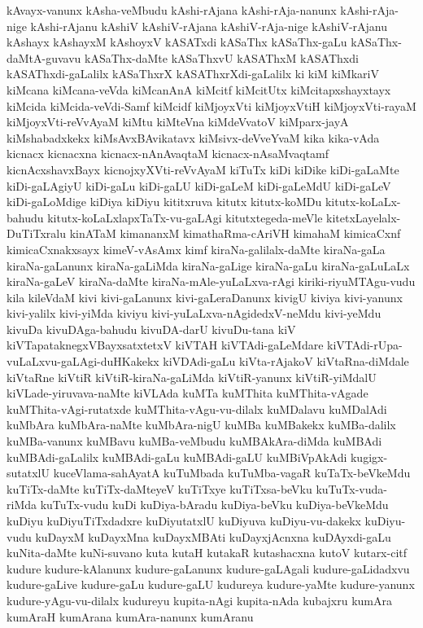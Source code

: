 {kAvayx-vanunx
kAsha-veMbudu
kAshi-rAjana
kAshi-rAja-nanunx
kAshi-rAja-nige
kAshi-rAjanu
kAshiV
kAshiV-rAjana
kAshiV-rAja-nige
kAshiV-rAjanu
kAshayx
kAshayxM
kAshoyxV
kASATxdi
kASaThx
kASaThx-gaLu
kASaThx-daMtA-guvavu
kASaThx-daMte
kASaThxvU
kASAThxM
kASAThxdi
kASAThxdi-gaLalilx
kASaThxrX
kASAThxrXdi-gaLalilx
ki
kiM
kiMkariV
kiMcana
kiMcana-veVda
kiMcanAnA
kiMcitf
kiMcitUtx
kiMcitapxshayxtayx
kiMcida
kiMcida-veVdi-Samf
kiMcidf
kiMjoyxVti
kiMjoyxVtiH
kiMjoyxVti-rayaM
kiMjoyxVti-reVvAyaM
kiMtu
kiMteVna
kiMdeVvatoV
kiMparx-jayA
kiMshabadxkekx
kiMsAvxBAvikatavx
kiMsivx-deVveYvaM
kika
kika-vAda
kicnacx
kicnacxna
kicnacx-nAnAvaqtaM
kicnacx-nAsaMvaqtamf
kicnAcxshavxBayx
kicnojxyXVti-reVvAyaM
kiTuTx
kiDi
kiDike
kiDi-gaLaMte
kiDi-gaLAgiyU
kiDi-gaLu
kiDi-gaLU
kiDi-gaLeM
kiDi-gaLeMdU
kiDi-gaLeV
kiDi-gaLoMdige
kiDiya
kiDiyu
kititxruva
kitutx
kitutx-koMDu
kitutx-koLaLx-bahudu
kitutx-koLaLxlapxTaTx-vu-gaLAgi
kitutxtegeda-meVle
kitetxLayelalx-DuTiTxralu
kinATaM
kimananxM
kimathaRma-cAriVH
kimahaM
kimicaCxnf
kimicaCxnakxsayx
kimeV-vAsAmx
kimf
kiraNa-galilalx-daMte
kiraNa-gaLa
kiraNa-gaLanunx
kiraNa-gaLiMda
kiraNa-gaLige
kiraNa-gaLu
kiraNa-gaLuLaLx
kiraNa-gaLeV
kiraNa-daMte
kiraNa-mAle-yuLaLxva-rAgi
kiriki-riyuMTAgu-vudu
kila
kileVdaM
kivi
kivi-gaLanunx
kivi-gaLeraDanunx
kivigU
kiviya
kivi-yanunx
kivi-yalilx
kivi-yiMda
kiviyu
kivi-yuLaLxva-nAgidedxV-neMdu
kivi-yeMdu
kivuDa
kivuDAga-bahudu
kivuDA-darU
kivuDu-tana
kiV
kiVTapataknegxVBayxsatxtetxV
kiVTAH
kiVTAdi-gaLeMdare
kiVTAdi-rUpa-vuLaLxvu-gaLAgi-duHKakekx
kiVDAdi-gaLu
kiVta-rAjakoV
kiVtaRna-diMdale
kiVtaRne
kiVtiR
kiVtiR-kiraNa-gaLiMda
kiVtiR-yanunx
kiVtiR-yiMdalU
kiVLade-yiruvava-naMte
kiVLAda
kuMTa
kuMThita
kuMThita-vAgade
kuMThita-vAgi-rutatxde
kuMThita-vAgu-vu-dilalx
kuMDalavu
kuMDalAdi
kuMbAra
kuMbAra-naMte
kuMbAra-nigU
kuMBa
kuMBakekx
kuMBa-dalilx
kuMBa-vanunx
kuMBavu
kuMBa-veMbudu
kuMBAkAra-diMda
kuMBAdi
kuMBAdi-gaLalilx
kuMBAdi-gaLu
kuMBAdi-gaLU
kuMBiVpAkAdi
kugigx-sutatxlU
kuceVlama-sahAyatA
kuTuMbada
kuTuMba-vagaR
kuTaTx-beVkeMdu
kuTiTx-daMte
kuTiTx-daMteyeV
kuTiTxye
kuTiTxsa-beVku
kuTuTx-vuda-riMda
kuTuTx-vudu
kuDi
kuDiya-bAradu
kuDiya-beVku
kuDiya-beVkeMdu
kuDiyu
kuDiyuTiTxdadxre
kuDiyutatxlU
kuDiyuva
kuDiyu-vu-dakekx
kuDiyu-vudu
kuDayxM
kuDayxMna
kuDayxMBAti
kuDayxjAcnxna
kuDAyxdi-gaLu
kuNita-daMte
kuNi-suvano
kuta
kutaH
kutakaR
kutashacxna
kutoV
kutarx-citf
kudure
kudure-kAlanunx
kudure-gaLanunx
kudure-gaLAgali
kudure-gaLidadxvu
kudure-gaLive
kudure-gaLu
kudure-gaLU
kudureya
kudure-yaMte
kudure-yanunx
kudure-yAgu-vu-dilalx
kudureyu
kupita-nAgi
kupita-nAda
kubajxru
kumAra
kumAraH
kumArana
kumAra-nanunx
kumAranu
}
